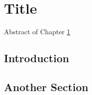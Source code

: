 \chapter{Title}\label{CHAP3}

\noindent Abstract of Chapter \ref{CHAP3}

\section{Introduction}\label{CHAP3_1}

\lipsum

\section{Another Section}\label{CHAP3_2}

\lipsum